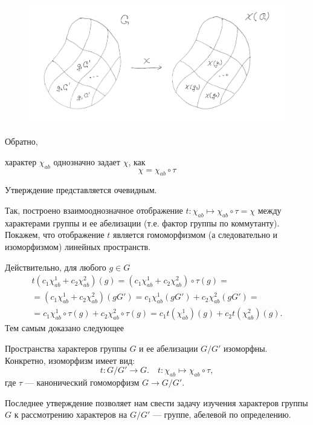     \begin{figure}[th]
        \centering
        \includegraphics[width=\textwidth]{pictures/chips}
        \caption{}
        \label{img_chi_factor}
    \end{figure}

    \newpage
    Обратно,
    \begin{statement} характер $\chi_{ab}$ однозначно задает $\chi$, как 
        \[\chi = \chi_{ab}\circ \tau\]
    \end{statement}
    Утверждение представляется очевидным.

    Так, построено взаимооднозначное отображение $t: \chi_{ab} \mapsto 
    \chi_{ab} \circ \tau = \chi$ между характерами группы и ее абелизации 
    (т.е. фактор группы по коммутанту). Покажем, что отображение $t$ является 
    гомоморфизмом (а следовательно и изоморфизмом) линейных пространств.

    Действительно, для любого $g \in G$
        \begin{multline*}
        t(c_1\chi_{ab}^1 + c_2\chi_{ab}^2)(g) 
        = (c_1\chi_{ab}^1 + c_2\chi_{ab}^2) \circ \tau (g) = \\
        = (c_1\chi_{ab}^1 + c_2\chi_{ab}^2) (gG')
        = c_1\chi_{ab}^1 (gG') + c_2\chi_{ab}^2 (gG') = \\
        = c_1\chi_{ab}^1 \circ \tau (g) + c_2\chi_{ab}^2 \circ \tau (g)
        = c_1 t(\chi_{ab}^1)(g) + c_2 t(\chi_{ab}^2)(g).
        \end{multline*}
    Тем самым доказано следующее
    \begin{statement}
        Пространства характеров группы $G$ и ее абелизации $G/G'$ изоморфны. 
        Конкретно, изоморфизм имеет вид:
        \begin{equation}\label{iso_GG'}
            t: G/G' \to G.\quad t: \chi_{ab} \mapsto \chi_{ab} \circ \tau,
        \end{equation}
        где $\tau$ --- канонический гомоморфизм $G \to G/G'$.
    \end{statement}
    
    Последнее утверждение позволяет нам свести задачу изучения характеров
    группы $G$ к рассмотрению характеров на $G/G'$ --- группе, абелевой по 
    определению.